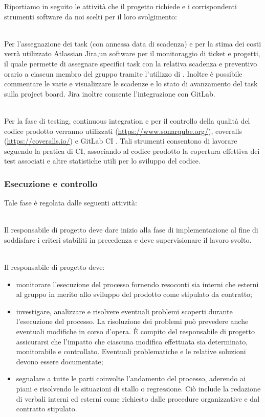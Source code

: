 Riportiamo in seguito le attività che il progetto richiede e i corrispondenti strumenti software da noi scelti per il loro svolgimento:

\leavevmode \\
Per l'assegnazione dei task (con annessa data di scadenza) e per la stima dei costi verrà utilizzato  Atlassian Jira,un software per il monitoraggio di ticket e progetti, il quale permette di assegnare specifici task con la relativa scadenza e preventivo orario a ciascun membro del gruppo tramite l'utilizzo di . Inoltre è possibile commentare le varie  e visualizzare le scadenze e lo stato di avanzamento del task sulla project board. Jira inoltre consente l'integrazione con GitLab.

\leavevmode \\
Per la fase di testing, continuous integration e per il controllo della qualità del codice prodotto verranno utilizzati  (\url{https://www.sonarqube.org/}), coveralls (\url{https://coveralls.io/}) e GitLab CI . Tali strumenti consentono di lavorare seguendo la pratica di CI, associando al codice prodotto la copertura effettiva dei test associati e altre  statistiche utili per lo sviluppo del codice.

\subsubsection{Esecuzione e controllo}
Tale fase è regolata dalle seguenti attività:

\leavevmode \\
Il responsabile di progetto deve dare inizio alla fase di implementazione al fine di soddisfare i criteri stabiliti in precedenza e deve supervisionare il lavoro svolto.

\leavevmode \\
Il responsabile di progetto deve:
\begin{itemize}
    \item monitorare l'esecuzione del processo fornendo resoconti sia interni che esterni al gruppo in merito allo sviluppo del prodotto come stipulato da contratto;
    \item investigare, analizzare e risolvere eventuali problemi scoperti durante l'esecuzione del processo. La risoluzione dei problemi può prevedere anche eventuali modifiche in corso d'opera. È compito del responsabile di progetto assicurarsi che l'impatto che ciascuna modifica effettuata sia determinato, monitorabile e controllato. Eventuali problematiche e le relative soluzioni devono essere documentate;
    \item segnalare a tutte le parti coinvolte l'andamento del processo, aderendo ai piani e risolvendo le situazioni di stallo o regressione. Ciò include la redazione di verbali interni ed esterni come richiesto dalle procedure organizzative e dal contratto stipulato.
\end{itemize}

